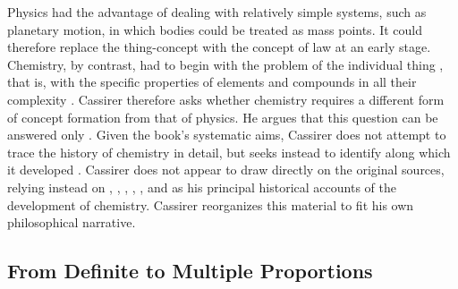 \documentclass[submitted,12pt]{article}
\begin{document}
Physics had the advantage of dealing with relatively simple systems, such as planetary motion, in which bodies could be treated as  mass points. It could therefore replace the thing-concept  with the concept of law  at an early stage. Chemistry, by contrast, had to begin with the problem of the individual thing , that is, with the specific properties of elements and compounds in all their complexity . Cassirer therefore asks whether chemistry requires a different form of concept formation from that of physics. He argues that this question can be answered only  . Given the book's systematic aims, Cassirer does not attempt to trace the history of chemistry in detail, but seeks instead to identify  along which it developed .  Cassirer does not appear to draw directly on the original sources, relying instead on \citet{Wurtz1879}, \citet{Meyer1884}, \citet{Berthelot1885}, \citet{Ladenburg1902}, \citet{Duhem1902}, and \citet{Ostwald1906Leitlinien} as his principal historical accounts of the development of chemistry. Cassirer reorganizes this material to fit his own philosophical narrative. 

\subsection{From Definite to Multiple Proportions}
\end{document}
